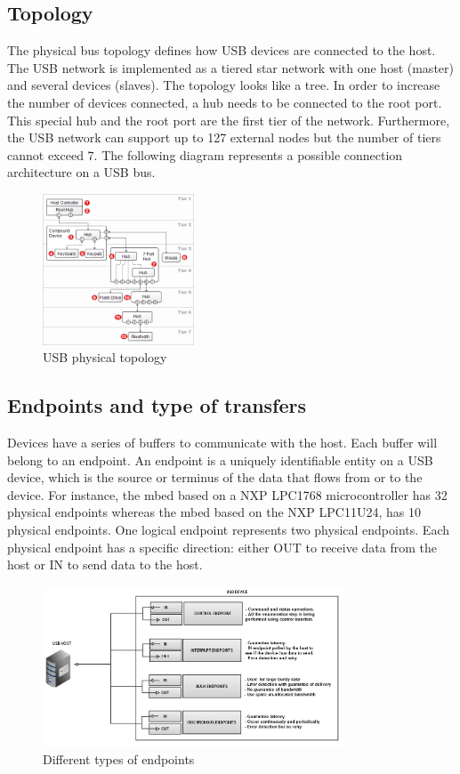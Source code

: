 \documentclass[pdftex,10pt,a4paper]{report}
\begin{document}
\subsection{Topology}
The physical bus topology defines how USB devices are connected to the host. The USB network is implemented as a tiered star network with one host (master) and several devices (slaves). The topology looks like a tree. In order to increase the number of devices connected, a hub needs to be connected to the root port. This special hub and the root port are the first tier of the network. Furthermore, the USB network can support up to 127 external nodes but the number of tiers cannot exceed 7. The following diagram represents a possible connection architecture on a USB bus.


\begin{figure}[h!]
		\centering
		\includegraphics[width=0.4\textwidth]{./usb_topology.png}
		\caption{USB physical topology \footnotemark}
		\label{USB physical topology}
\end{figure}
\subsection{Endpoints and type of transfers}
Devices have a series of buffers to communicate with the host. Each buffer will belong to an endpoint. An endpoint is a uniquely identifiable entity on a USB device, which is the source or terminus of the data that flows from or to the device. For instance, the mbed based on a NXP LPC1768 microcontroller has 32 physical endpoints whereas the mbed based on the NXP LPC11U24, has 10 physical endpoints. One logical endpoint represents two physical endpoints. Each physical endpoint has a specific direction: either OUT to receive data from the host or IN to send data to the host. 



\begin{figure}[h!]
		\centering
		\includegraphics[width=0.8\textwidth]{./endpoint.jpg}
		\caption{Different types of endpoints}
		\label{Different types of endpoints}
\end{figure}
\end{document}
